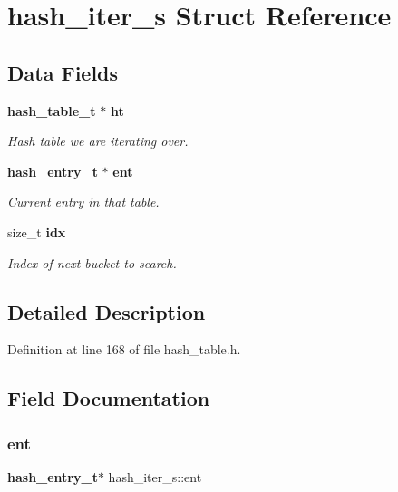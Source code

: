 \section{hash\+\_\+iter\+\_\+s Struct Reference}
\label{structhash__iter__s}
\subsection*{Data Fields}
\begin{DoxyCompactItemize}
\item 
\textbf{ hash\+\_\+table\+\_\+t} $\ast$ \textbf{ ht}
\begin{DoxyCompactList}\small\item\em Hash table we are iterating over. \end{DoxyCompactList}\item 
\textbf{ hash\+\_\+entry\+\_\+t} $\ast$ \textbf{ ent}
\begin{DoxyCompactList}\small\item\em Current entry in that table. \end{DoxyCompactList}\item 
size\+\_\+t \textbf{ idx}
\begin{DoxyCompactList}\small\item\em Index of next bucket to search. \end{DoxyCompactList}\end{DoxyCompactItemize}


\subsection{Detailed Description}


Definition at line 168 of file hash\+\_\+table.\+h.



\subsection{Field Documentation}
\mbox{\label{structhash__iter__s_a8aa7d6656a165e2e74c42ae4c48ed78f}} 
\subsubsection{ent}
{\footnotesize\ttfamily \textbf{ hash\+\_\+entry\+\_\+t}$\ast$ hash\+\_\+iter\+\_\+s\+::ent}



